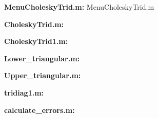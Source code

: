 \documentclass[12pt]{article}
\begin{document}
{\bf MenuCholeskyTrid.m:}
 {MenuCholeskyTrid.m}

\medskip 
{\bf CholeskyTrid.m:}


\medskip 
{\bf CholeskyTrid1.m:}


\medskip 
{\bf Lower\_triangular.m:}


\medskip 
{\bf Upper\_triangular.m:}


\medskip 
{\bf tridiag1.m:}


\medskip 
{\bf calculate\_errors.m:}

\end{document}
